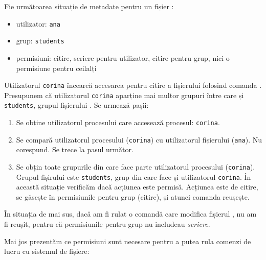 Fie următoarea situație de metadate pentru un fișier :

\begin{itemize}
  \item utilizator: \texttt{ana}
  \item grup: \texttt{students}
  \item permisiuni: citire, scriere pentru utilizator, citire pentru grup,
		nici o permisiune pentru ceilalți
\end{itemize}

Utilizatorul \texttt{corina} încearcă accesarea pentru citire a fișierului folosind comanda . Presupunem că utilizatorul \texttt{corina} aparține mai multor grupuri între care și \texttt{students}, grupul fișierului . Se urmează pașii:

\begin{enumerate}
  \item Se obține utilizatorul procesului care accesează procesul: \texttt{corina}.
  \item Se compară utilizatorul procesului (\texttt{corina}) cu utilizatorul
    fișierului (\texttt{ana}). Nu corespund. Se trece la pasul următor.
  \item Se obțin toate grupurile din care face parte utilizatorul
          procesului (\texttt{corina}). Grupul fișirului  este \texttt{students}, grup din care face și utilizatorul \texttt{corina}. În această situație verificăm dacă acțiunea este
		permisă. Acțiunea este de citire, se găsește în permisiunile
                pentru grup (citire), și atunci comanda  reușește.
\end{enumerate}

În situația de mai sus, dacă am fi rulat o comandă care modifica fișierul
, nu am fi reușit, pentru că permisiunile pentru grup nu includeau
\textit{scriere}.

Mai jos prezentăm ce permisiuni sunt necesare pentru a putea rula comenzi de
lucru cu sistemul de fișiere:

